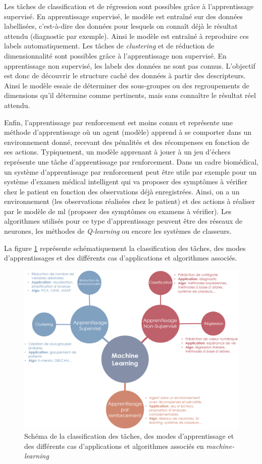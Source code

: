 Les tâches de classification et de régression sont possibles grâce à l'apprentissage supervisé. En apprentissage supervisé, le modèle est entraîné sur des données labellisées, c'est-à-dire des données pour lesquels on connaît déjà le résultat attendu (diagnostic par exemple). Ainsi le modèle est entraîné à reproduire ces labels automatiquement.
Les tâches de \textit{clustering} et de réduction de dimensionnalité sont possibles grâce à l'apprentissage non supervisé. En apprentissage non supervisé, les labels des données ne sont pas connus. L'objectif est donc de découvrir le structure caché des données à partir des descripteurs. Ainsi le modèle essaie de déterminer des sous-groupes ou des regroupements de dimensions qu'il détermine comme pertinents, mais sans connaître le résultat réel attendu.

Enfin, l'apprentissage par renforcement est moins connu et représente une méthode d'apprentissage où un agent (modèle) apprend à se comporter dans un environnement donné, recevant des pénalités et des récompenses en fonction de ses actions. Typiquement,  un modèle apprenant à jouer à un jeu d'échecs représente une tâche d'apprentissage par renforcement. Dans un cadre biomédical, un système d'apprentissage par renforcement peut être utile par exemple pour un système d'examen médical intelligent qui va proposer des symptômes à vérifier chez le patient en fonction des observations déjà enregistrées. Ainsi, on a un environnement (les observations réalisées chez le patient) et des actions à réaliser par le modèle de \gls{ml} (proposer des symptômes ou examens à vérifier). Les algorithmes utilisés pour ce type d'apprentissage peuvent être des réseaux de neurones, les méthodes de \textit{Q-learning} ou encore les systèmes de classeurs.

La figure \ref{fig:ml-landscape} représente schématiquement la classification des tâches, des modes d'apprentissages et des différents cas d'applications et algorithmes associés.
\begin{figure}[!ht]
 \centering
 \includegraphics[width=1\textwidth]{figures/ml_landscape.png}
 \caption[Schéma des méthodes de machine-learning]{Schéma de la classification des tâches, des modes d'apprentissage et des différents cas d'applications et algorithmes associés en \textit{machine-learning}}
 \label{fig:ml-landscape}
\end{figure}

